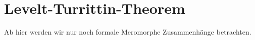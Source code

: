 \chapter{Levelt-\!Turrittin-\!Theorem}
\begin{comment}
Quellen:\\
sabbah\_cimpa90 seite 28 / 30

\begin{thm}[Levelt-Turittin]
Es ex. endliche Körper $\hat{L}|\hat{K}$ mit $\hat{L}=\C((u))$ mit
$\hat{K}\hookrightarrow\hat{L},x\mapsto u^p$ so dass:
\[
\hat{M}\otimes_{\hat{K}}\hat{L}=\bigoplus_{i=1}^r\hat{M}_i
\]
mit $#\slopes(\hat{M}_i)=1 \forall i$ bzw. genauer
$\hat{M}_i=\xi^{\phi_i}\otimes R$
\end{thm}

\begin{thm}[Levelt-Turrittin-Malgrange]
$\exists \hat L|\hat K$ mit $\hat M_i\otimes _{\hat K}\hat L =
\bigoplus_{j=1}^s \hat N_j$
mit 
\[
\hat N_i=\xi^{\phi_j}\otimes R
\]
und 
\begin{itemize}
\item $\dim_L\xi^{\phi_j}=1$, $\phi_j\in \C[u^{-1}]\cdot u^{-1}$
\item R regulär singulär, also mit $\slopes=\{0\}$ %
\end{itemize}
\end{thm}
\end{comment}

Ab hier werden wir nur noch formale Meromorphe Zusammenhänge betrachten. 

\begin{comment}
Sei $M_{\hat{K}}=\cD_{\hat{K}}/\cD_{\hat{K}}\cdot P$ und nehme an, dass $N(P)$
zumindes 2 nichttriviale Steigungen hat. Spalte $N(P)=N_1\dot\cup N_2$ in 2
Teile. Dann gilt:

\begin{lem}
Es existiert eine Aufteilung $P=P_1P_2$ mit:
\begin{itemize}
\item $N(P_1)\subset N_1$ und $N(P_2)\subset N_2$
\item A ist eine kante von ...
\end{itemize}
\end{lem}
\end{comment}

